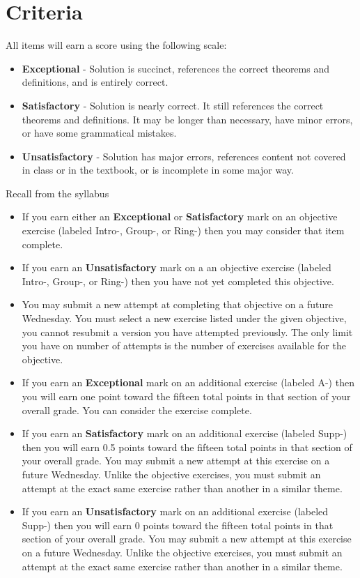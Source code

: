 \documentclass[12pt]{article}
\begin{document}
	\section*{Criteria}
		All items will earn a score using the following scale:
		\begin{itemize}
			\item \textbf{Exceptional} - Solution is succinct, references the correct theorems and definitions, and is entirely correct.
			\item \textbf{Satisfactory} - Solution is nearly correct. It still references the correct theorems and definitions. 
					It may be longer than necessary, have minor errors, or have some grammatical mistakes.
			\item \textbf{Unsatisfactory} - Solution has major errors, references content not covered in class or in the textbook, or is incomplete in some major way.
		\end{itemize}
		Recall from the syllabus
		\begin{itemize}
			\item If you earn either an \textbf{Exceptional} or \textbf{Satisfactory} mark on an objective exercise (labeled Intro-, Group-, or Ring-) then you may consider that item complete. 
			\item If you earn an \textbf{Unsatisfactory} mark on a an objective exercise (labeled Intro-, Group-, or Ring-) then you have not yet completed this objective.
			\item You may submit a new attempt at completing that objective on a future Wednesday. You must select a new exercise listed under the given objective, you cannot resubmit a version you have attempted previously.  The only limit you have on number of attempts is the number of exercises available for the objective.
			\item If you earn an \textbf{Exceptional} mark on an additional exercise (labeled A-) then you will earn one point toward the fifteen total points in that section of your overall grade. You can consider the exercise complete.
			\item If you earn an \textbf{Satisfactory} mark on an additional exercise (labeled Supp-) then you will earn 0.5 points toward the fifteen total points in that section of your overall grade. You may submit a new attempt at this exercise on a future Wednesday. Unlike the objective exercises, you must submit an attempt at the exact same exercise rather than another in a similar theme.
			\item If you earn an \textbf{Unsatisfactory} mark on an additional exercise (labeled Supp-) then you will earn 0 points toward the fifteen total points in that section of your overall grade. You may submit a new attempt at this exercise on a future Wednesday. Unlike the objective exercises, you must submit an attempt at the exact same exercise rather than another in a similar theme.
		\end{itemize}
	
\end{document}

